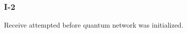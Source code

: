 \subsubsection{I-2}\label{sec:error_code_i_2}

Receive attempted before quantum network was initialized.
